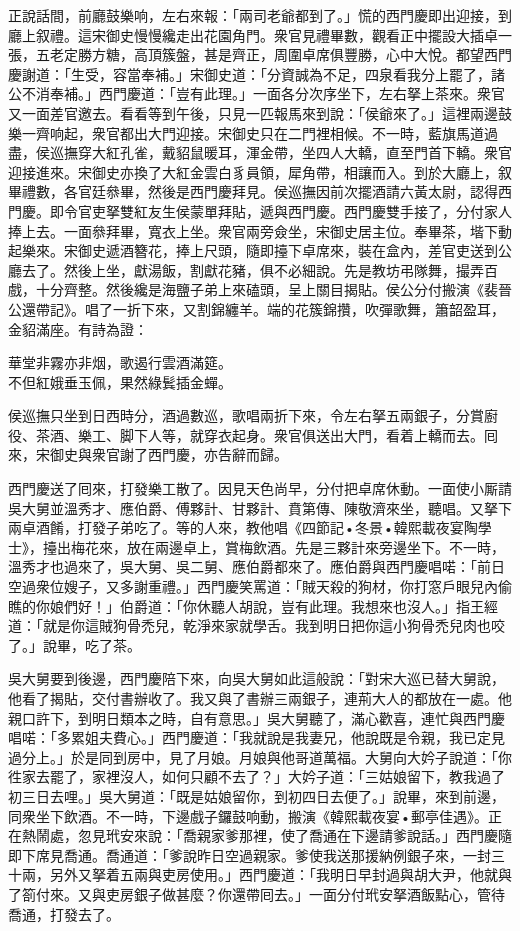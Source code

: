 正說話間，前廳鼓樂响，左右來報：「兩司老爺都到了。」慌的西門慶即出迎接，到廳上叙禮。這宋御史慢慢纔走出花園角門。衆官見禮畢數，觀看正中擺設大插卓一張，五老定勝方糖，高頂簇盤，甚是齊正，周圍卓席俱豐勝，心中大悅。都望西門慶謝道：「生受，容當奉補。」宋御史道：「分資誠為不足，四泉看我分上罷了，諸公不消奉補。」西門慶道：「豈有此理。」一面各分次序坐下，左右拏上茶來。衆官又一面差官邀去。看看等到午後，只見一匹報馬來到說：「侯爺來了。」這裡兩邊鼓樂一齊响起，衆官都出大門迎接。宋御史只在二門裡相候。不一時，藍旗馬道過盡，侯巡撫穿大紅孔雀，戴貂鼠暖耳，渾金帶，坐四人大轎，直至門首下轎。衆官迎接進來。宋御史亦換了大紅金雲白豸員領，犀角帶，相讓而入。到於大廳上，叙畢禮數，各官廷叅畢，然後是西門慶拜見。侯巡撫因前次擺酒請六黃太尉，認得西門慶。即令官吏拏雙紅友生侯蒙單拜貼，遞與西門慶。西門慶雙手接了，分付家人捧上去。一面叅拜畢，寬衣上坐。衆官兩旁僉坐，宋御史居主位。奉畢茶，堦下動起樂來。宋御史遞酒簪花，捧上尺頭，隨即擡下卓席來，裝在盒內，差官吏送到公廳去了。然後上坐，獻湯飯，割獻花豬，俱不必細說。先是教坊弔隊舞，撮弄百戲，十分齊整。然後纔是海鹽子弟上來磕頭，呈上關目揭貼。侯公分付搬演《裴晉公還帶記》。唱了一折下來，又割錦纏羊。端的花簇錦攢，吹彈歌舞，簫韶盈耳，金貂滿座。{}有詩為證：

\begin{myquote} 
華堂非霧亦非烟，歌遏行雲酒滿筵。\\不但紅娥垂玉佩，果然綠鬂插金蟬。
\end{myquote} 

侯巡撫只坐到日西時分，酒過數巡，歌唱兩折下來，令左右拏五兩銀子，分賞廚役、茶酒、樂工、脚下人等，就穿衣起身。衆官俱送出大門，看着上轎而去。囘來，宋御史與衆官謝了西門慶，亦告辭而歸。

西門慶送了囘來，打發樂工散了。因見天色尚早，分付把卓席休動。一面使小厮請吳大舅並溫秀才、應伯爵、傅夥計、甘夥計、賁第傳、陳敬濟來坐，聽唱。又拏下兩卓酒餚，打發子弟吃了。等的人來，教他唱《四節記•冬景•韓熙載夜宴陶學士》，擡出梅花來，放在兩邊卓上，賞梅飲酒。先是三夥計來旁邊坐下。不一時，溫秀才也過來了，吳大舅、吳二舅、應伯爵都來了。應伯爵與西門慶唱喏：「前日空過衆位嫂子，又多謝重禮。」西門慶笑罵道：「賊天殺的狗材，你打窓戶眼兒內偷瞧的你娘們好！」{}伯爵道：「你休聽人胡說，豈有此理。我想來也沒人。」{}指王經道：「就是你這賊狗骨禿兒，乾淨來家就學舌。我到明日把你這小狗骨禿兒肉也咬了。」說畢，吃了茶。

吳大舅要到後邊，西門慶陪下來，向吳大舅如此這般說：「對宋大巡已替大舅說，他看了揭貼，交付書辦收了。我又與了書辦三兩銀子，連荊大人的都放在一處。他親口許下，到明日類本之時，自有意思。」吳大舅聽了，滿心歡喜，連忙與西門慶唱喏：「多累姐夫費心。」西門慶道：「我就說是我妻兄，他說既是令親，我已定見過分上。」於是同到房中，見了月娘。月娘與他哥道萬福。大舅向大妗子說道：「你徃家去罷了，家裡沒人，如何只顧不去了？」大妗子道：「三姑娘留下，教我過了初三日去哩。」吳大舅道：「既是姑娘留你，到初四日去便了。」說畢，來到前邊，同衆坐下飲酒。不一時，下邊戲子鑼鼓响動，搬演《韓熙載夜宴•郵亭佳遇》。正在熱鬧處，忽見玳安來說：「喬親家爹那裡，使了喬通在下邊請爹說話。」西門慶隨即下席見喬通。喬通道：「爹說昨日空過親家。爹使我送那援納例銀子來，一封三十兩，另外又拏着五兩與吏房使用。」西門慶道：「我明日早封過與胡大尹，他就與了箚付來。又與吏房銀子做甚麼？你還帶囘去。」一面分付玳安拏酒飯點心，管待喬通，打發去了。

